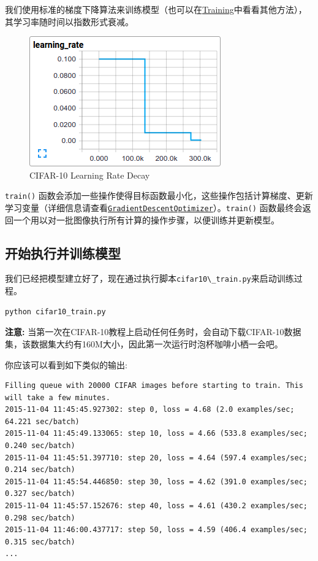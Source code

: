 我们使用标准的梯度下降算法来训练模型（也可以在\href{https://github.com/jikexueyuanwiki/tensorflow-zh/blob/master/SOURCE/api_docs/python/train.md}{Training}中看看其他方法），其学习率随时间以指数形式衰减。

\begin{figure}[htbp]
\centering
\includegraphics{../SOURCE/images/cifar_lr_decay.png}
\caption{CIFAR-10 Learning Rate Decay}
\end{figure}

\lstinline{train()}
函数会添加一些操作使得目标函数最小化，这些操作包括计算梯度、更新学习变量（详细信息请查看\href{tensorflow-zh/SOURCE/api_docs/python/train.md\#GradientDescentOptimizer}{\lstinline{GradientDescentOptimizer}}）。\lstinline{train()}
函数最终会返回一个用以对一批图像执行所有计算的操作步骤，以便训练并更新模型。

\subsection{开始执行并训练模型
}\label{ux5f00ux59cbux6267ux884cux5e76ux8badux7ec3ux6a21ux578b}

我们已经把模型建立好了，现在通过执行脚本\lstinline{cifar10\_train.py}来启动训练过程。

\begin{lstlisting}
python cifar10_train.py
\end{lstlisting}

\textbf{注意:}
当第一次在CIFAR-10教程上启动任何任务时，会自动下载CIFAR-10数据集，该数据集大约有160M大小，因此第一次运行时泡杯咖啡小栖一会吧。

你应该可以看到如下类似的输出:

\begin{lstlisting}
Filling queue with 20000 CIFAR images before starting to train. This will take a few minutes.
2015-11-04 11:45:45.927302: step 0, loss = 4.68 (2.0 examples/sec; 64.221 sec/batch)
2015-11-04 11:45:49.133065: step 10, loss = 4.66 (533.8 examples/sec; 0.240 sec/batch)
2015-11-04 11:45:51.397710: step 20, loss = 4.64 (597.4 examples/sec; 0.214 sec/batch)
2015-11-04 11:45:54.446850: step 30, loss = 4.62 (391.0 examples/sec; 0.327 sec/batch)
2015-11-04 11:45:57.152676: step 40, loss = 4.61 (430.2 examples/sec; 0.298 sec/batch)
2015-11-04 11:46:00.437717: step 50, loss = 4.59 (406.4 examples/sec; 0.315 sec/batch)
...
\end{lstlisting}

